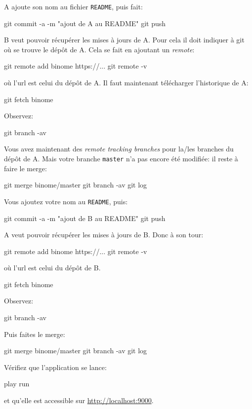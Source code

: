 \documentclass{TD}
\begin{document}

A ajoute son nom au fichier \texttt{README}, puis fait:
\begin{bash}
git commit -a -m "ajout de A au README"
git push
\end{bash}


B veut pouvoir récupérer les mises à jours de A.  Pour cela il doit indiquer à
git où se trouve le dépôt de A.  Cela se fait en ajoutant un \emph{remote}:
\begin{bash}
git remote add binome https://...
git remote -v
\end{bash}
où l'url est celui du dépôt de A.  Il faut maintenant télécharger l'historique
de A:
\begin{bash}
git fetch binome
\end{bash}
Observez:
\begin{bash}
git branch -av
\end{bash}
Vous avez maintenant des \emph{remote tracking branches} pour la/les branches
du dépôt de A.  Mais votre branche \texttt{master} n'a pas encore été modifiée:
il reste à faire le merge:
\begin{bash}
git merge binome/master
git branch -av
git log
\end{bash}
Vous ajoutez votre nom au \texttt{README}, puis:
\begin{bash}
git commit -a -m "ajout de B au README"
git push
\end{bash}


A veut pouvoir récupérer les mises à jours de B.  Donc à son tour:
\begin{bash}
git remote add binome https://...
git remote -v
\end{bash}
où l'url est celui du dépôt de B.
\begin{bash}
git fetch binome
\end{bash}
Observez:
\begin{bash}
git branch -av
\end{bash}
Puis faites le merge:
\begin{bash}
git merge binome/master
git branch -av
git log
\end{bash}


Vérifiez que l'application se lance:
\begin{bash}
play run
\end{bash}
et qu'elle est accessible sur \url{http://localhost:9000}.
\end{document}
